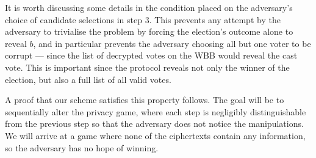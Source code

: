 \documentclass[12pt,a4paper]{article}
\theoremstyle{definition}
\begin{document}
It is worth discussing some details in the condition placed on the adversary's choice of candidate selections in step 3. This prevents any attempt by the adversary to trivialise the problem by forcing the election's outcome alone to reveal $b$, and in particular prevents the adversary choosing all but one voter to be corrupt --- since the list of decrypted votes on the WBB would reveal the cast vote. This is important since the protocol reveals not only the winner of the election, but also a full list of all valid votes.

A proof that our scheme satisfies this property follows. The goal will be to sequentially alter the privacy game, where each step is negligibly distinguishable from the previous step so that the adversary does not notice the manipulations. We will arrive at a game where none of the ciphertexts contain any information, so the adversary has no hope of winning.
\end{document}
